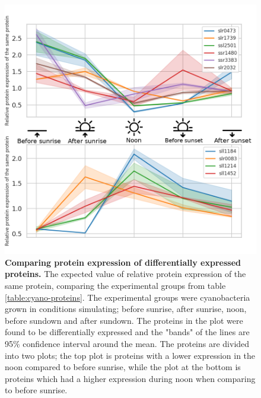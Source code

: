 \begin{figure}[H]
  \begin{center}
  \includegraphics[width=\linewidth]{results/combined_edited.png}
  \caption{\textbf{Comparing protein expression of differentially expressed proteins.} The expected value of relative protein expression of the same protein, comparing the experimental groups from table \ref{table:cyano-proteins}. The experimental groups were cyanobacteria grown in conditions simulating; before sunrise, after sunrise, noon, before sundown and after sundown. The proteins in the plot were found to be differentially expressed and the "bands" of the lines are 95\% confidence interval around the mean. The proteins are divided into two plots; the top plot is proteins with a lower expression in the noon compared to before sunrise, while the plot at the bottom is proteins which had a higher expression during noon when comparing to before sunrise.}
  \label{fig:expression}
  \end{center}
\end{figure}
